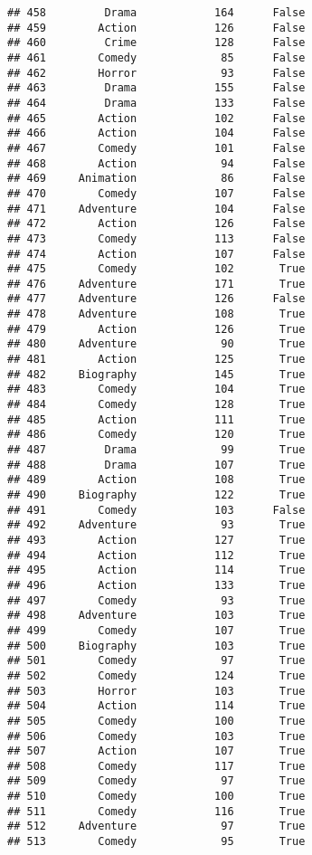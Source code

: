 \documentclass[
]{article}
\begin{document}
\begin{verbatim}
## 458         Drama            164      False
## 459        Action            126      False
## 460         Crime            128      False
## 461        Comedy             85      False
## 462        Horror             93      False
## 463         Drama            155      False
## 464         Drama            133      False
## 465        Action            102      False
## 466        Action            104      False
## 467        Comedy            101      False
## 468        Action             94      False
## 469     Animation             86      False
## 470        Comedy            107      False
## 471     Adventure            104      False
## 472        Action            126      False
## 473        Comedy            113      False
## 474        Action            107      False
## 475        Comedy            102       True
## 476     Adventure            171       True
## 477     Adventure            126      False
## 478     Adventure            108       True
## 479        Action            126       True
## 480     Adventure             90       True
## 481        Action            125       True
## 482     Biography            145       True
## 483        Comedy            104       True
## 484        Comedy            128       True
## 485        Action            111       True
## 486        Comedy            120       True
## 487         Drama             99       True
## 488         Drama            107       True
## 489        Action            108       True
## 490     Biography            122       True
## 491        Comedy            103      False
## 492     Adventure             93       True
## 493        Action            127       True
## 494        Action            112       True
## 495        Action            114       True
## 496        Action            133       True
## 497        Comedy             93       True
## 498     Adventure            103       True
## 499        Comedy            107       True
## 500     Biography            103       True
## 501        Comedy             97       True
## 502        Comedy            124       True
## 503        Horror            103       True
## 504        Action            114       True
## 505        Comedy            100       True
## 506        Comedy            103       True
## 507        Action            107       True
## 508        Comedy            117       True
## 509        Comedy             97       True
## 510        Comedy            100       True
## 511        Comedy            116       True
## 512     Adventure             97       True
## 513        Comedy             95       True

\end{verbatim}
\end{document}
